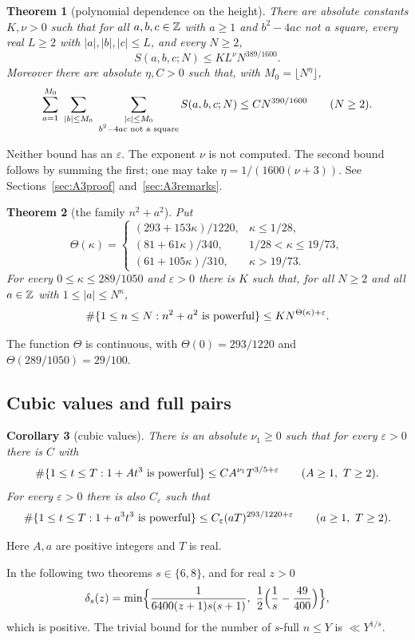 \documentclass[11pt,reqno]{amsart}
\newtheorem{theorem}{Theorem}[section]
\newtheorem{corollary}[theorem]{Corollary}
\theoremstyle{definition}
\theoremstyle{remark}
\numberwithin{equation}{section}
\newcommand{\eps}{\varepsilon}\newcommand{\card}{\#}
\begin{document}
\begin{theorem}[polynomial dependence on the height]\label{thm:uniform}
There are absolute constants $K,\nu>0$ such that for
all $a,b,c\in\mathbb Z$ with $a\ge1$ and $b^2-4ac$ not a square, every real
$L\ge2$ with $|a|,|b|,|c|\le L$, and every $N\ge2$,
\[
 S(a,b,c;N)\le KL^{\nu}N^{389/1600}.
\]
Moreover there are absolute $\eta,C>0$ such that, with
$M_0=\lfloor N^{\eta}\rfloor$,
\[
 \sum_{a=1}^{M_0}\ \sum_{|b|\le M_0}\ \sum_{\substack{|c|\le M_0\\ b^2-4ac\textnormal{ not a square}}}
 S(a,b,c;N)\le CN^{390/1600}\qquad(N\ge2).
\]
\end{theorem}
Neither bound has an $\eps$. The exponent $\nu$ is not computed. The second
bound follows by summing the first; one may take
$\eta=1/(1600(\nu+3))$. See
Sections~\ref{sec:A3proof} and~\ref{sec:A3remarks}.

\begin{theorem}[the family $n^2+a^2$]\label{thm:family}
Put
\[
 \Theta(\kappa)=\begin{cases}
 (293+153\kappa)/1220,&\kappa\le1/28,\\
 (81+61\kappa)/340,&1/28<\kappa\le19/73,\\
 (61+105\kappa)/310,&\kappa>19/73.
 \end{cases}
\]
For every $0\le\kappa\le289/1050$ and $\eps>0$ there is $K$ such that, for
all $N\ge2$ and all $a\in\mathbb Z$ with $1\le|a|\le N^{\kappa}$,
\[
 \card\{1\le n\le N:n^2+a^2\textnormal{ is powerful}\}\le KN^{\Theta(\kappa)+\eps}.
\]
\end{theorem}
The function $\Theta$ is continuous, with $\Theta(0)=293/1220$ and
$\Theta(289/1050)=29/100$.

\subsection{Cubic values and full pairs}
\begin{corollary}[cubic values]\label{cor:cubic}
There is an absolute $\nu_1\ge0$ such that for every $\eps>0$
there is $C$ with
\[
 \card\{1\le t\le T:1+At^3\textnormal{ is powerful}\}\le CA^{\nu_1}T^{3/5+\eps}
 \qquad(A\ge1,\ T\ge2).
\]
For every $\eps>0$ there is also $C_\eps$ such that
\[
 \card\{1\le t\le T:1+a^3t^3\textnormal{ is powerful}\}
 \le C_\eps(aT)^{293/1220+\eps}\qquad(a\ge1,\ T\ge2).
\]
\end{corollary}

Here $A,a$ are positive integers and $T$ is real.

In the following two theorems $s\in\{6,8\}$, and for real $z>0$
\[
 \delta_s(z)=\min\Bigl\{\frac{1}{6400(z+1)s(s+1)},\ \frac12\Bigl(\frac1s-\frac{49}{400}\Bigr)\Bigr\},
\]
which is positive. The trivial bound for the number of $s$-full $n\le Y$ is
$\ll Y^{1/s}$.
\end{document}
